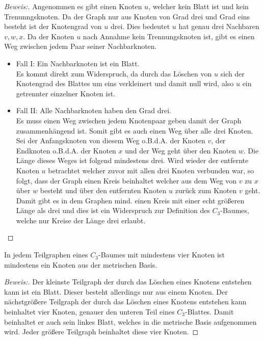 \begin{proof}[Beweis:]
Angenommen es gibt einen Knoten $u$, welcher kein Blatt ist und kein Trenunngsknoten. Da der Graph nur aus Knoten von Grad drei und Grad eins besteht ist der Knotengrad von $u$ drei. Dies bedeutet $u$ hat genau drei Nachbaren $v,w,x$. Da der Knoten $u$ nach Annahme kein Trennungsknoten ist, gibt es einen Weg zwischen jedem Paar seiner Nachbarknoten.
\begin{itemize}
\item Fall I: Ein Nachbarknoten ist ein Blatt.\\ Es kommt direkt zum Widerspruch, da durch das Löschen von $u$ sich der Knotengrad des Blattes um eins verkleinert und damit null wird, also $u$ ein getrennter einzelner Knoten ist.
\item Fall II: Alle Nachbarknoten haben den Grad drei.\\
Es muss einen Weg zwischen jedem Knotenpaar geben damit der Graph zusammenhängend ist. Somit gibt es auch einen Weg über alle drei Knoten. Sei der Anfangsknoten von diesem Weg o.B.d.A. der Knoten $v$, der Endknoten o.B.d.A. der Knoten $x$ und der Weg geht über den Knoten $w$. Die Länge dieses Weges ist folgend mindestens drei. Wird wieder der entfernte Knoten $u$ betrachtet welcher zuvor mit allen drei Knoten verbunden war, so folgt, dass der Graph einen Kreis beinhaltet welcher aus dem Weg von $v$ zu $x$ über $w$ besteht und über den entfernten Knoten $u$ zurück zum Knoten $v$ geht.\\
Damit gibt es in dem Graphen mind. einen Kreis mit einer echt größeren Länge als drei und dies ist ein Widerspruch zur Definition des $C_{3}$-Baumes, welche nur Kreise der Länge drei erlaubt.
\end{itemize}
\end{proof}
\begin{lem}
\label{bkb2}
In jedem Teilgraphen eines $C_{3}$-Baumes mit mindestens vier Knoten ist mindestens ein Knoten aus der metrischen Basis.
\end{lem}
\begin{proof}[Beweis:]
Der kleinste Teilgraph der durch das Löschen eines Knotens entstehen kann ist ein Blatt. Dieser besteht allerdings nur aus einem Knoten. Der nächstgrößere Teilgraph der durch das Löschen eines Knotens entstehen kann beinhaltet vier Knoten, genauer den unteren Teil eines $C_{3}$-Blattes. Damit beinhaltet er auch sein linkes Blatt, welches in die metrische Basis aufgenommen wird. Jeder größere Teilgraph beinhaltet diese vier Knoten. %
\end{proof}
